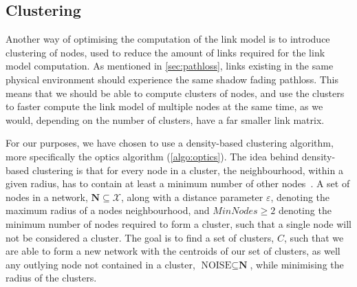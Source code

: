 \subsection{Clustering}\label{sec:clustering}
Another way of optimising the computation of the link model is to introduce clustering of nodes, used to reduce the amount of links required for the link model computation. As mentioned in \autoref{sec:pathloss}, links existing in the same physical environment should experience the same shadow fading \gls{pathloss}. This means that we should be able to compute clusters of nodes, and use the clusters to faster compute the link model of multiple nodes at the same time, as we would, depending on the number of clusters, have a far smaller link matrix. \medbreak

For our purposes, we have chosen to use a density-based clustering algorithm, more specifically the \gls{optics} algorithm (\autoref{algo:optics}). The idea behind density-based clustering is that for every node in a cluster, the neighbourhood, within a given radius, has to contain at least a minimum number of other nodes~\cite[p.~50]{Ankerst:1999:OOP:304182.304187}. A set of nodes in a network, $\textbf{N} \subseteq \mathcal{X}$, along with a distance parameter $\varepsilon$, denoting the maximum radius of a nodes neighbourhood, and $MinNodes \geq 2$ denoting the minimum number of nodes required to form a cluster, such that a single node will not be considered a cluster. The goal is to find a set of clusters, $C$, such that we are able to form a new network with the centroids of our set of clusters, as well any outlying node not contained in a cluster, $\text{NOISE} \subseteq \textbf{N}$, while minimising the radius of the clusters.



